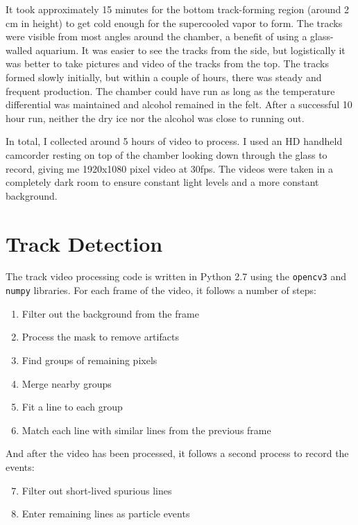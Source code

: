 \documentclass[notitlepage]{article}
\begin{document}
It took approximately 15 minutes for the bottom track-forming region (around 2 cm in height) to get cold enough for the supercooled vapor to form.  The tracks were visible from most angles around the chamber, a benefit of using a glass-walled aquarium. It was easier to see the tracks from the side, but logistically it was better to take pictures and video of the tracks from the top. The tracks formed slowly initially, but within a couple of hours, there was steady and frequent production. The chamber could have run as long as the temperature differential was maintained and alcohol remained in the felt.  After a successful 10 hour run, neither the dry ice nor the alcohol was close to running out.

In total, I collected around 5 hours of video to process.  I used an HD handheld camcorder resting on top of the chamber looking down through the glass to record, giving me 1920x1080 pixel video at 30fps.  The videos were taken in a completely dark room to ensure constant light levels and a more constant background.  

\section{Track Detection}

The track video processing code is written in Python 2.7 using the \texttt{opencv3} and \texttt{numpy} libraries.  For each frame of the video, it follows a number of steps:
\begin{enumerate}
	\item Filter out the background from the frame
	\item Process the mask to remove artifacts
	\item Find groups of remaining pixels
	\item Merge nearby groups
	\item Fit a line to each group
	\item Match each line with similar lines from the previous frame
\end{enumerate}

And after the video has been processed, it follows a second process to record the events:
\begin{enumerate}
	\setcounter{enumi}{6}
	\item Filter out short-lived spurious lines
	\item Enter remaining lines as particle events
\end{enumerate}
\end{document}
